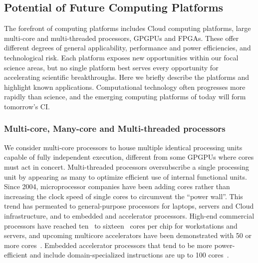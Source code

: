 \subsection{Potential of Future Computing Platforms}
The forefront of computing platforms includes Cloud computing platforms, large multi-core and
multi-threaded processors, GPGPUs and FPGAs. These offer different degrees of general applicability,
performance and power efficiencies, and technological risk. 
Each platform exposes new
opportunities within our focal science areas, but no single platform best serves every opportunity
for accelerating scientific breakthroughs. 
Here we briefly describe the platforms and highlight
known applications. Computational technology often progresses more rapidly than science, and the
emerging computing platforms of today will form tomorrow's CI.

\subsubsection{Multi-core, Many-core and Multi-threaded processors}
We consider multi-core processors to house multiple identical processing units capable of fully
independent execution, different from some GPGPUs where cores must act in concert. 
Multi-threaded processors oversubscribe a single processing unit by appearing as many to optimize
efficient use of internal functional units. 
Since 2004, microprocessor companies have been adding
cores rather than increasing the clock speed of single cores to circumvent the ``power wall''.
This
trend has permeated to general-purpose processors for laptops, servers and Cloud infrastructure, and
to embedded and accelerator processors. 
High-end commercial processors have reached ten~\cite{conf/isscc/SawantDSSRADN11} to
sixteen~\cite{Butler:2011:BAM,conf/isscc/ShinTHPPHLSJSGLS10} cores per chip for workstations and servers, and upcoming multicore accelerators
have been demonstrated with 50 or more cores~\cite{intel.mic}. 
Embedded accelerator processors that tend to
be more power-efficient and include domain-specialized instructions are up to 100 cores~\cite{Bell2008, TileGX8100}.

